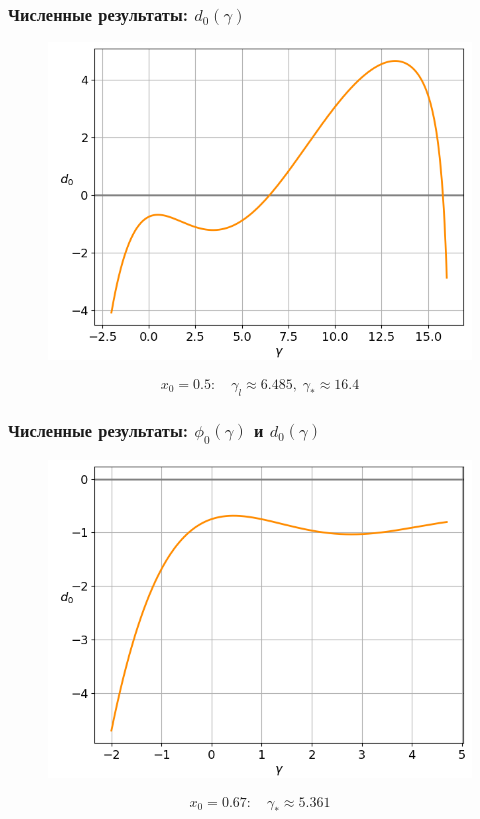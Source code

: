 \documentclass[fullscreen=true, unicode, bookmarks=false]{beamer}
\begin{document}
\begin{frame}
\frametitle{ Численные результаты: $ d_0(\gamma) $ }

\begin{figure} 
\includegraphics[scale=0.55]{divergent_d0_0,50.png}  
\end{figure}

$$ x_0 = 0.5: \quad \gamma_l \approx 6.485, \; \gamma_* \approx 16.4 $$

\end{frame}

\begin{frame}
\frametitle{ Численные результаты: $ \phi_0(\gamma) $ и $ d_0(\gamma) $ }

\begin{figure} 
\includegraphics[scale=0.55]{divergent_d0_0,67.png}  
\end{figure}

$$ x_0 = 0.67: \quad \gamma_* \approx 5.361 $$

\end{frame}
\end{document}
